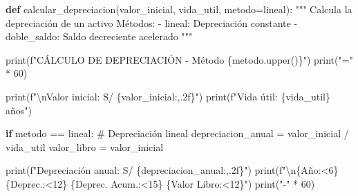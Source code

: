 \documentclass[
  doc,
  floatsintext,
  longtable,
  a4paper,
  nolmodern,
  notxfonts,
  notimes,
  12pt,
  colorlinks=true,linkcolor=blue,citecolor=blue,urlcolor=blue]{apa7}
\newenvironment{Shaded}{\begin{snugshade}}{\end{snugshade}}
\newcommand{\BuiltInTok}[1]{\textcolor[rgb]{0.00,0.23,0.31}{#1}}
\newcommand{\CharTok}[1]{\textcolor[rgb]{0.13,0.47,0.30}{#1}}
\newcommand{\CommentTok}[1]{\textcolor[rgb]{0.37,0.37,0.37}{#1}}
\newcommand{\ControlFlowTok}[1]{\textcolor[rgb]{0.00,0.23,0.31}{\textbf{#1}}}
\newcommand{\DecValTok}[1]{\textcolor[rgb]{0.68,0.00,0.00}{#1}}
\newcommand{\KeywordTok}[1]{\textcolor[rgb]{0.00,0.23,0.31}{\textbf{#1}}}
\newcommand{\NormalTok}[1]{\textcolor[rgb]{0.00,0.23,0.31}{#1}}
\newcommand{\OperatorTok}[1]{\textcolor[rgb]{0.37,0.37,0.37}{#1}}
\newcommand{\SpecialCharTok}[1]{\textcolor[rgb]{0.37,0.37,0.37}{#1}}
\newcommand{\SpecialStringTok}[1]{\textcolor[rgb]{0.13,0.47,0.30}{#1}}
\newcommand{\StringTok}[1]{\textcolor[rgb]{0.13,0.47,0.30}{#1}}
\begin{document}
\begin{Shaded}
\begin{Highlighting}[]
\KeywordTok{def}\NormalTok{ calcular\_depreciacion(valor\_inicial, vida\_util, metodo}\OperatorTok{=}\StringTok{\textquotesingle{}lineal\textquotesingle{}}\NormalTok{):}
    \CommentTok{"""}
\CommentTok{    Calcula la depreciación de un activo}
\CommentTok{    }
\CommentTok{    Métodos:}
\CommentTok{    {-} \textquotesingle{}lineal\textquotesingle{}: Depreciación constante}
\CommentTok{    {-} \textquotesingle{}doble\_saldo\textquotesingle{}: Saldo decreciente acelerado}
\CommentTok{    """}
    
    \BuiltInTok{print}\NormalTok{(}\SpecialStringTok{f"CÁLCULO DE DEPRECIACIÓN {-} Método }\SpecialCharTok{\{}\NormalTok{metodo}\SpecialCharTok{.}\NormalTok{upper()}\SpecialCharTok{\}}\SpecialStringTok{"}\NormalTok{)}
    \BuiltInTok{print}\NormalTok{(}\StringTok{"="} \OperatorTok{*} \DecValTok{60}\NormalTok{)}
    
    \BuiltInTok{print}\NormalTok{(}\SpecialStringTok{f"}\CharTok{\textbackslash{}n}\SpecialStringTok{Valor inicial: S/ }\SpecialCharTok{\{}\NormalTok{valor\_inicial}\SpecialCharTok{:,.2f\}}\SpecialStringTok{"}\NormalTok{)}
    \BuiltInTok{print}\NormalTok{(}\SpecialStringTok{f"Vida útil: }\SpecialCharTok{\{}\NormalTok{vida\_util}\SpecialCharTok{\}}\SpecialStringTok{ años"}\NormalTok{)}
    
    \ControlFlowTok{if}\NormalTok{ metodo }\OperatorTok{==} \StringTok{\textquotesingle{}lineal\textquotesingle{}}\NormalTok{:}
        \CommentTok{\# Depreciación lineal}
\NormalTok{        depreciacion\_anual }\OperatorTok{=}\NormalTok{ valor\_inicial }\OperatorTok{/}\NormalTok{ vida\_util}
\NormalTok{        valor\_libro }\OperatorTok{=}\NormalTok{ valor\_inicial}
        
        \BuiltInTok{print}\NormalTok{(}\SpecialStringTok{f"Depreciación anual: S/ }\SpecialCharTok{\{}\NormalTok{depreciacion\_anual}\SpecialCharTok{:,.2f\}}\SpecialStringTok{"}\NormalTok{)}
        \BuiltInTok{print}\NormalTok{(}\SpecialStringTok{f"}\CharTok{\textbackslash{}n}\SpecialCharTok{\{}\StringTok{\textquotesingle{}Año\textquotesingle{}}\SpecialCharTok{:\textless{}6\}}\SpecialStringTok{ }\SpecialCharTok{\{}\StringTok{\textquotesingle{}Deprec.\textquotesingle{}}\SpecialCharTok{:\textless{}12\}}\SpecialStringTok{ }\SpecialCharTok{\{}\StringTok{\textquotesingle{}Deprec. Acum.\textquotesingle{}}\SpecialCharTok{:\textless{}15\}}\SpecialStringTok{ }\SpecialCharTok{\{}\StringTok{\textquotesingle{}Valor Libro\textquotesingle{}}\SpecialCharTok{:\textless{}12\}}\SpecialStringTok{"}\NormalTok{)}
        \BuiltInTok{print}\NormalTok{(}\StringTok{"{-}"} \OperatorTok{*} \DecValTok{60}\NormalTok{)}
        

\end{Highlighting}
\end{Shaded}
\end{document}
